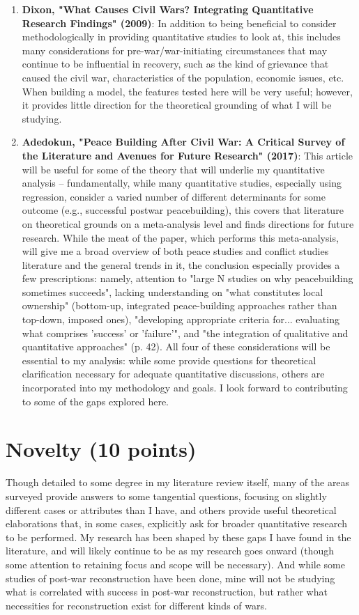 \documentclass[11pt]{article}
\begin{document}
\begin{enumerate}
    \item \textbf{Dixon, "What Causes Civil Wars? Integrating Quantitative Research Findings" (2009)}: In addition to being beneficial to consider methodologically in providing quantitative studies to look at, this includes many considerations for pre-war/war-initiating circumstances that may continue to be influential in recovery, such as the kind of grievance that caused the civil war, characteristics of the population, economic issues, etc. When building a model, the features tested here will be very useful; however, it provides little direction for the theoretical grounding of what I will be studying.
    \item \textbf{Adedokun, "Peace Building After Civil War: A Critical Survey of the Literature and Avenues for Future Research" (2017)}: This article will be useful for some of the theory that will underlie my quantitative analysis -- fundamentally, while many quantitative studies, especially using regression, consider a varied number of different determinants for some outcome (e.g., successful postwar peacebuilding), this covers that literature on theoretical grounds on a meta-analysis level and finds directions for future research. While the meat of the paper, which performs this meta-analysis, will give me a broad overview of both peace studies and conflict studies literature and the general trends in it, the conclusion especially provides a few prescriptions: namely, attention to "large N studies on why peacebuilding sometimes succeeds", lacking understanding on "what constitutes local ownership" (bottom-up, integrated peace-building approaches rather than top-down, imposed ones), "developing appropriate criteria for... evaluating what comprises 'success' or 'failure'", and "the integration of qualitative and quantitative approaches" (p. 42). All four of these considerations will be essential to my analysis: while some provide questions for theoretical clarification necessary for adequate quantitative discussions, others are incorporated into my methodology and goals. I look forward to contributing to some of the gaps explored here.
\end{enumerate}

\section{Novelty (10 points)}
Though detailed to some degree in my literature review itself, many of the areas surveyed provide answers to some tangential questions, focusing on slightly different cases or attributes than I have, and others provide useful theoretical elaborations that, in some cases, explicitly ask for broader quantitative research to be performed. My research has been shaped by these gaps I have found in the literature, and will likely continue to be as my research goes onward (though some attention to retaining focus and scope will be necessary). And while some studies of post-war reconstruction have been done, mine will not be studying what is correlated with success in post-war reconstruction, but rather what necessities for reconstruction exist for different kinds of wars.   
\end{document}
